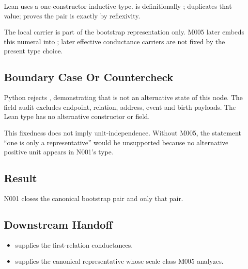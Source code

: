 Lean uses a one-constructor inductive type. \texttt{\protect{}} is
definitionally \texttt{\protect{}}; \texttt{\protect{}} duplicates
that value; \texttt{\protect{}} proves the pair is
exactly \texttt{\protect{}} by reflexivity.

The local \texttt{\protect{}} carrier is part of the bootstrap representation
only. M005 later embeds this numeral into \texttt{\protect{}}; later effective
conductance carriers are not fixed by the present type choice.

\subsection{Boundary Case Or
Countercheck}\label{boundary-case-or-countercheck-4}

Python rejects \texttt{\protect{}},
demonstrating that \texttt{\protect{}} is not an alternative state of this node.
The field audit excludes endpoint, relation, address, event and birth
payloads. The Lean type has no alternative constructor or field.

This fixedness does not imply unit-independence. Without M005, the
statement ``one is only a representative'' would be unsupported because
no alternative positive unit appears in N001's type.

\subsection{Result}\label{result-9}

N001 closes the canonical bootstrap pair \texttt{\protect{}} and only that
pair.

\subsection{Downstream Handoff}\label{downstream-handoff-9}

\begin{itemize}
\tightlist
\item
  \texttt{\protect{}} supplies the
  first-relation conductances.
\item
  \texttt{\protect{}} supplies the canonical
  representative whose scale class M005 analyzes.
\end{itemize}

